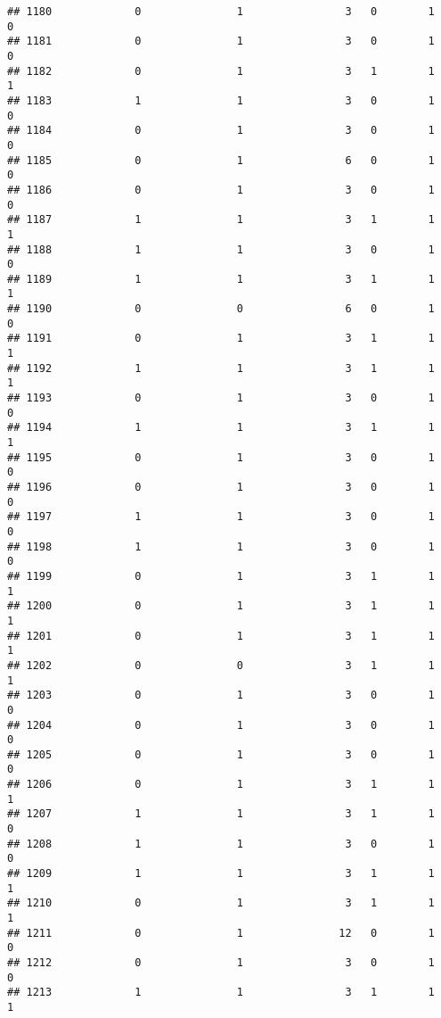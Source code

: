 \documentclass[]{article}
\begin{document}
\begin{verbatim}
## 1180             0               1                3   0        1        0
## 1181             0               1                3   0        1        0
## 1182             0               1                3   1        1        1
## 1183             1               1                3   0        1        0
## 1184             0               1                3   0        1        0
## 1185             0               1                6   0        1        0
## 1186             0               1                3   0        1        0
## 1187             1               1                3   1        1        1
## 1188             1               1                3   0        1        0
## 1189             1               1                3   1        1        1
## 1190             0               0                6   0        1        0
## 1191             0               1                3   1        1        1
## 1192             1               1                3   1        1        1
## 1193             0               1                3   0        1        0
## 1194             1               1                3   1        1        1
## 1195             0               1                3   0        1        0
## 1196             0               1                3   0        1        0
## 1197             1               1                3   0        1        0
## 1198             1               1                3   0        1        0
## 1199             0               1                3   1        1        1
## 1200             0               1                3   1        1        1
## 1201             0               1                3   1        1        1
## 1202             0               0                3   1        1        1
## 1203             0               1                3   0        1        0
## 1204             0               1                3   0        1        0
## 1205             0               1                3   0        1        0
## 1206             0               1                3   1        1        1
## 1207             1               1                3   1        1        0
## 1208             1               1                3   0        1        0
## 1209             1               1                3   1        1        1
## 1210             0               1                3   1        1        1
## 1211             0               1               12   0        1        0
## 1212             0               1                3   0        1        0
## 1213             1               1                3   1        1        1

\end{verbatim}
\end{document}
